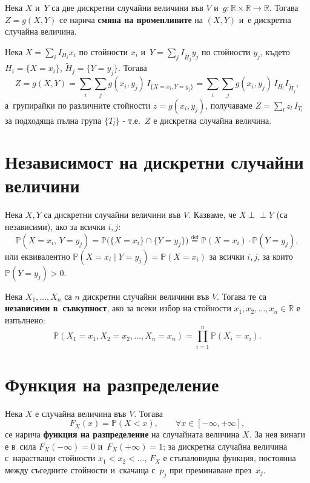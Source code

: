 \begin{defbox}
Нека $X$ и~$Y$ са две дискретни случайни величини във $V$ и~$g:\mathbb R\times\mathbb R\to\mathbb R$. Тогава $Z=g(X,Y)$ се нарича
\textbf{смяна на променливите} на $(X,Y)$ и~е дискретна случайна
величина.
\end{defbox}

\begin{proofbox}
Нека $X=\sum_i I_{H_i}x_i$ по стойности $x_i$ и~$Y=\sum_j I_{\widetilde H_j} y_j$ по стойности $y_j$,
където $H_i=\{X=x_i\}$, $\widetilde H_j = \{Y=y_j\}$. Тогава
\[
  Z = g(X,Y) = \sum_i\sum_j g(x_i,y_j)\,I_{\{X=x_i,Y=y_j\}} = \sum_i\sum_j g(x_i,y_j)\,I_{H_i}I_{\widetilde H_j},
\]
а~групирайки по различните стойности $z=g(x_i,y_j)$, получаваме
$Z=\sum_l z_l\,I_{T_l}$ за подходяща пълна група $\{T_l\}$ -
т.е.\ $Z$ е дискретна случайна величина. \qedbg
\end{proofbox}

\section{Независимост на дискретни случайни величини}

\begin{defbox}[~(Независимост)]
Нека $X,Y$ са дискретни случайни величини във $V$. Казваме, че
$X\perp\!\!\!\perp Y$ (са независими), ако за всички $i,j$:
\[
  \mathbb P(X=x_i,\,Y=y_j) = \mathbb P\big(\{X=x_i\}\cap\{Y=y_j\}\big) \overset{\text{def}}{=} \mathbb P(X=x_i)\cdot\mathbb P(Y=y_j),
\]
или еквивалентно $\mathbb P(X=x_i\mid Y=y_j)=\mathbb P(X=x_i)$ за
всички $i,j$, за които $\mathbb P(Y=y_j)>0$.
\end{defbox}

\begin{defbox}
Нека $X_1,\dots,X_n$ са $n$ дискретни случайни величини във $V$.
Тогава те са \textbf{независими в~съвкупност}, ако за всеки избор на
стойности $x_1,x_2,\dots,x_n\in\mathbb R$ е изпълнено:
\[
  \mathbb P(X_1=x_1,X_2=x_2,\dots,X_n=x_n) = \prod_{i=1}^{n}\mathbb P(X_i=x_i).
\]
\end{defbox}

\section{Функция на разпределение}

\begin{defbox}
Нека $X$ е случайна величина във $V$. Тогава
\[
  F_X(x) = \mathbb P(X< x),\qquad \forall x\in[-\infty,+\infty],
\]
се нарича \textbf{функция на разпределение} на случайната величина
$X$. За нея винаги е в~сила $F_X(-\infty)=0$ и~$F_X(+\infty)=1$; за
дискретна случайна величина с~нарастващи стойности $x_1<x_2<\dots$,
$F_X$ е стъпаловидна функция, постоянна между съседните стойности и~скачаща с~$p_j$ при преминаване през~$x_j$.
\end{defbox}
